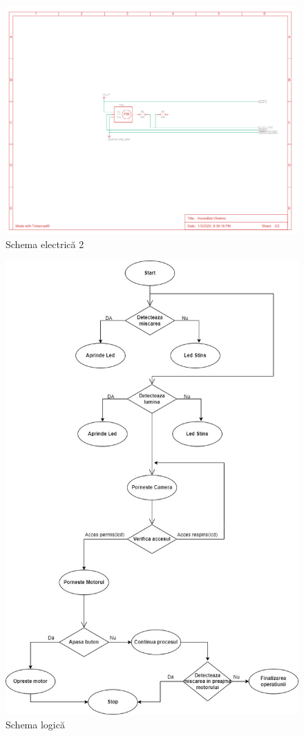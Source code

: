\documentclass[a4paper,12pt]{report}
\begin{document}
\begin{figure}[H]
    \centering
    \includegraphics[width=0.8\linewidth]{SchemaElectrica2.png}
    \caption{Schema electrică 2}
    \label{fig:enter-label}
\end{figure}
\begin{figure}[H]
    \centering
    \includegraphics[width=0.8\linewidth]{Schema logica.jpg}
    \caption{Schema logică}
    \label{fig:enter-label}
\end{figure}
\end{document}
